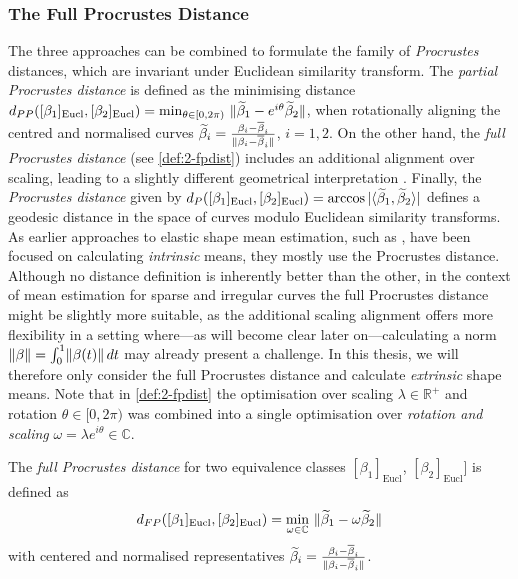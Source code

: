 \subsubsection*{The Full Procrustes Distance}
The three approaches can be combined to formulate the family of \emph{Procrustes} distances, which are invariant under Euclidean similarity transform.
The \emph{partial Procrustes distance} is defined as the minimising distance $d_{PP}([\beta_1]_\text{Eucl}, [\beta_2]_\text{Eucl}) = \min_{\theta \in [0,2\pi)} \,\, \lVert\widetilde\beta_1 - e^{i\theta} \widetilde\beta_2\rVert$, when rotationally aligning the centred and normalised curves $\widetilde\beta_i= \frac{\beta_i - \overline\beta_i}{\lVert\beta_i - \overline\beta_i\rVert}$, $i=1,2$.
On the other hand, the \emph{full Procrustes distance} (see \cref{def:2-fpdist}) includes an additional alignment over scaling, leading to a slightly different geometrical interpretation \parencite[see][77-78]{DrydenMardia2016}.
Finally, the \emph{Procrustes distance} given by $d_P([\beta_1]_{\mathrm{Eucl}}, [\beta_2]_{\mathrm{Eucl}}) = \arccos{\lvert\langle \widetilde \beta_1, \widetilde \beta_2 \rangle\rvert}$ defines a geodesic distance in the space of curves modulo Euclidean similarity transforms.
As earlier approaches to elastic shape mean estimation, such as \cite{SrivastavaEtAl2011}, have been focused on calculating \emph{intrinsic} means, they mostly use the Procrustes distance.
Although no distance definition is inherently better than the other, in the context of mean estimation for sparse and irregular curves the full Procrustes distance might be slightly more suitable, as the additional scaling alignment offers more flexibility in a setting where---as will become clear later on---calculating a norm $\lVert\beta\rVert = \int_0^1 \lVert\beta(t)\rVert\, dt$ may already present a challenge.
In this thesis, we will therefore only consider the full Procrustes distance and calculate \emph{extrinsic} shape means.
Note that in \cref{def:2-fpdist} the optimisation over scaling $\lambda \in \mathbb{R}^+$ and rotation $\theta \in [0,2\pi)$ was combined into a single optimisation over \emph{rotation and scaling} $\omega = \lambda e^{i\theta} \in \mathbb{C}$.
\begin{definition}
  \label{def:2-fpdist}
  The \emph{full Procrustes distance} for two equivalence classes $[\beta_1]_\text{Eucl}$, $[\beta_2]_\text{Eucl}]$ is defined as
  \begin{equation}
    \label{eq:2-fpdist-def}
    d_{FP}([\beta_1]_\text{Eucl}, [\beta_2]_\text{Eucl}) = \min_{\omega \in \mathbb{C}} \,\, \lVert\widetilde\beta_1 - \omega \widetilde\beta_2\rVert
  \end{equation}
  with centered and normalised representatives $\widetilde\beta_i = \frac{\beta_i - \overline\beta_i}{\lVert\beta_i - \overline\beta_i\rVert}$.
\end{definition}

